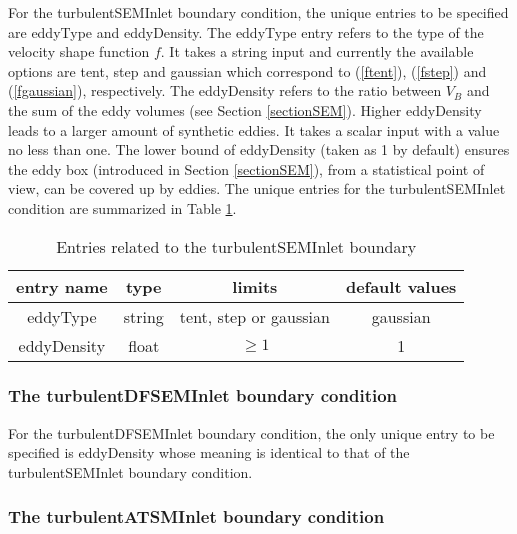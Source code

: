 For the \textcolor{mauve}{turbulentSEMInlet} boundary condition, the unique entries to be specified are \textcolor{mauve}{eddyType} and \textcolor{mauve}{eddyDensity}. The \textcolor{mauve}{eddyType} entry refers to the type of the velocity shape function $f$. It takes a string input and currently the available options are \textcolor{mauve}{tent}, \textcolor{mauve}{step} and \textcolor{mauve}{gaussian} which correspond to (\ref{ftent}), (\ref{fstep}) and (\ref{fgaussian}), respectively. The \textcolor{mauve}{eddyDensity} refers to the ratio between $V_B$ and the sum of the eddy volumes (see Section \ref{sectionSEM}). Higher \textcolor{mauve}{eddyDensity} leads to a larger amount of synthetic eddies. It takes a scalar input with a value no less than one. The lower bound of \textcolor{mauve}{eddyDensity} (taken as 1 by default) ensures the eddy box (introduced in Section \ref{sectionSEM}), from a statistical point of view, can be covered up by eddies. The unique entries for the \textcolor{mauve}{turbulentSEMInlet} condition are summarized in Table \ref{entryEddy}.

\begin{table}[H]
\centering
\begin{tabular}{c|c|c|c}
\hline
entry name & type & limits & default values \\
\hline
\textcolor{mauve}{eddyType} & string & tent, step or gaussian & gaussian \\
\hline
\textcolor{mauve}{eddyDensity} & float & $\geq 1$ & 1 \\
\hline
\end{tabular} \caption{Entries related to the \textcolor{mauve}{turbulentSEMInlet} boundary}\label{entryEddy}
\end{table}

\subsubsection{The \textcolor{mauve}{turbulentDFSEMInlet} boundary condition}

For the \textcolor{mauve}{turbulentDFSEMInlet} boundary condition, the only unique entry to be specified is \textcolor{mauve}{eddyDensity} whose meaning is identical to that of the \textcolor{mauve}{turbulentSEMInlet} boundary condition. 


\subsubsection{The \textcolor{mauve}{turbulentATSMInlet} boundary condition}

